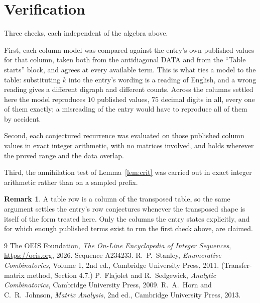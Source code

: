 \documentclass[11pt,a4paper]{article}
\theoremstyle{plain}
\theoremstyle{definition}
\newtheorem{remark}[theorem]{Remark}
\begin{document}
\section{Verification}

Three checks, each independent of the algebra above.

First, each column model was compared against the entry's own published values for that
column, taken both from the antidiagonal DATA and from the ``Table starts'' block, and agrees
at every available term. This is what ties a model to the table: substituting $k$ into the
entry's wording is a reading of English, and a wrong reading gives a different digraph and
different counts. Across the columns settled here the model reproduces $10$ published
values, $75$ decimal digits in all, every one of them exactly; a misreading of the entry
would have to reproduce all of them by accident.

Second, each conjectured recurrence was evaluated on those published column values in exact
integer arithmetic, with no matrices involved, and holds wherever the proved range and the
data overlap.

Third, the annihilation test of Lemma~\ref{lem:crit} was carried out in exact integer
arithmetic rather than on a sampled prefix.

\begin{remark}
A table row is a column of the transposed table, so the same argument settles the entry's row
conjectures whenever the transposed shape is itself of the form treated here. Only the columns
the entry states explicitly, and for which enough published terms exist to run the first check
above, are claimed.
\end{remark}

\begin{thebibliography}{9}
 The OEIS Foundation, \emph{The On-Line Encyclopedia of Integer
Sequences}, \url{https://oeis.org}, 2026. Sequence A234233.
 R.~P.~Stanley, \emph{Enumerative Combinatorics}, Volume 1, 2nd ed.,
Cambridge University Press, 2011. (Transfer-matrix method, Section 4.7.)
 P.~Flajolet and R.~Sedgewick, \emph{Analytic Combinatorics}, Cambridge
University Press, 2009.
 R.~A.~Horn and C.~R.~Johnson, \emph{Matrix Analysis}, 2nd ed., Cambridge
University Press, 2013.
\end{thebibliography}
\end{document}
